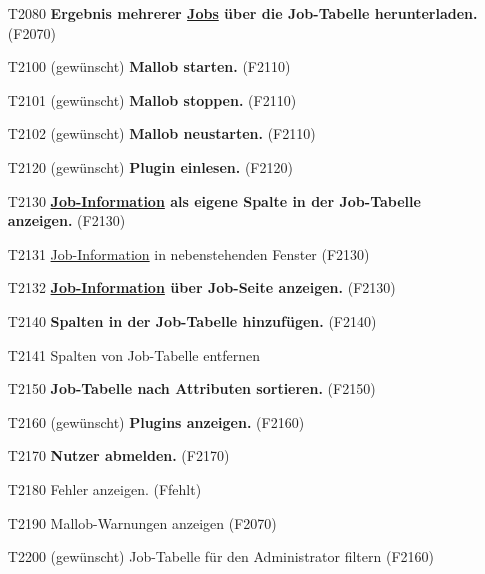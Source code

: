 \begin{itemize}
    \item[T2080] \textbf{Ergebnis mehrerer \hyperref[B:Jobs]{Jobs} über die Job-Tabelle herunterladen.} (F2070)
    
    \item[T2100] (gewünscht) \textbf{Mallob starten.} (F2110)
    
    \item[T2101] (gewünscht) \textbf{Mallob stoppen.} (F2110)
    
    \item[T2102] (gewünscht) \textbf{Mallob neustarten.} (F2110)
    
    \item[T2120] (gewünscht) \textbf{Plugin einlesen.} (F2120)
    
    \item[T2130] \textbf{\hyperref[B:Job-Informationen]{Job-Information} als eigene Spalte in der Job-Tabelle anzeigen.} (F2130)
    
    \item[T2131] \hyperref[B:Job-Informationen]{Job-Information} in nebenstehenden Fenster (F2130)
    
    \item[T2132] \textbf{\hyperref[B:Job-Informationen]{Job-Information} über Job-Seite anzeigen.} (F2130)
    
    \item[T2140] \textbf{Spalten in der Job-Tabelle hinzufügen.} (F2140)
    
    \item[T2141] Spalten von Job-Tabelle entfernen 
    
    \item[T2150] \textbf{Job-Tabelle nach Attributen sortieren.} (F2150)
    
    \item[T2160] (gewünscht) \textbf{Plugins anzeigen.} (F2160)
    
    \item[T2170] \textbf{\gls{Nutzer} abmelden.} (F2170)
    
    \item[T2180] Fehler anzeigen. (Ffehlt)
    
    \item[T2190] Mallob-Warnungen anzeigen (F2070)
    
    \item[T2200] (gewünscht) Job-Tabelle für den \gls{Administrator} filtern (F2160)
    
\end{itemize}

